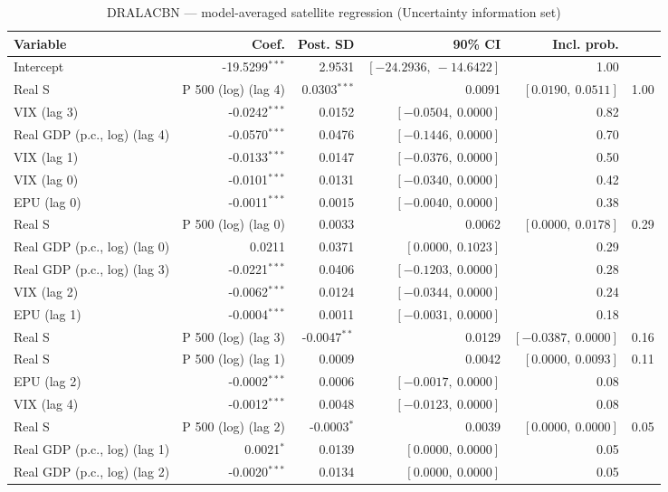 \begin{table}[!htbp]
\centering
\caption{DRALACBN --- model-averaged satellite regression (Uncertainty information set)}
\label{tab:dralacbn_uncertainty_bma_satellite}
\begin{tabular}{lrrrr}
\toprule
Variable & Coef. & Post. SD & 90\% CI & Incl. prob. \\
\midrule
Intercept & -19.5299$^{***}$ & 2.9531 & $[-24.2936,\ -14.6422]$ & 1.00 \\
Real S&P 500 (log) (lag 4) & 0.0303$^{***}$ & 0.0091 & $[0.0190,\ 0.0511]$ & 1.00 \\
VIX (lag 3) & -0.0242$^{***}$ & 0.0152 & $[-0.0504,\ 0.0000]$ & 0.82 \\
Real GDP (p.c., log) (lag 4) & -0.0570$^{***}$ & 0.0476 & $[-0.1446,\ 0.0000]$ & 0.70 \\
VIX (lag 1) & -0.0133$^{***}$ & 0.0147 & $[-0.0376,\ 0.0000]$ & 0.50 \\
VIX (lag 0) & -0.0101$^{***}$ & 0.0131 & $[-0.0340,\ 0.0000]$ & 0.42 \\
EPU (lag 0) & -0.0011$^{***}$ & 0.0015 & $[-0.0040,\ 0.0000]$ & 0.38 \\
Real S&P 500 (log) (lag 0) & 0.0033 & 0.0062 & $[0.0000,\ 0.0178]$ & 0.29 \\
Real GDP (p.c., log) (lag 0) & 0.0211 & 0.0371 & $[0.0000,\ 0.1023]$ & 0.29 \\
Real GDP (p.c., log) (lag 3) & -0.0221$^{***}$ & 0.0406 & $[-0.1203,\ 0.0000]$ & 0.28 \\
VIX (lag 2) & -0.0062$^{***}$ & 0.0124 & $[-0.0344,\ 0.0000]$ & 0.24 \\
EPU (lag 1) & -0.0004$^{***}$ & 0.0011 & $[-0.0031,\ 0.0000]$ & 0.18 \\
Real S&P 500 (log) (lag 3) & -0.0047$^{**}$ & 0.0129 & $[-0.0387,\ 0.0000]$ & 0.16 \\
Real S&P 500 (log) (lag 1) & 0.0009 & 0.0042 & $[0.0000,\ 0.0093]$ & 0.11 \\
EPU (lag 2) & -0.0002$^{***}$ & 0.0006 & $[-0.0017,\ 0.0000]$ & 0.08 \\
VIX (lag 4) & -0.0012$^{***}$ & 0.0048 & $[-0.0123,\ 0.0000]$ & 0.08 \\
Real S&P 500 (log) (lag 2) & -0.0003$^{*}$ & 0.0039 & $[0.0000,\ 0.0000]$ & 0.05 \\
Real GDP (p.c., log) (lag 1) & 0.0021$^{*}$ & 0.0139 & $[0.0000,\ 0.0000]$ & 0.05 \\
Real GDP (p.c., log) (lag 2) & -0.0020$^{***}$ & 0.0134 & $[0.0000,\ 0.0000]$ & 0.05 \\

\end{tabular}
\end{table}

